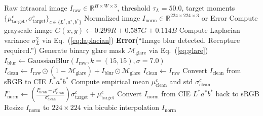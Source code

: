 \documentclass[journal]{IEEEtran}
\begin{document}
\begin{algorithm}[t]
\caption{Optical Standardization and Reinhard Color Normalization}
\label{alg:optical_normalization}
\begin{algorithmic}[1]
\REQUIRE Raw intraoral image $I_{\text{raw}} \in \mathbb{R}^{H \times W \times 3}$, threshold $\tau_L = 50.0$, target moments $\{\mu_{\text{target}}^c, \sigma_{\text{target}}^c\}_{c \in \{L^*, a^*, b^*\}}$
\ENSURE Normalized image $I_{\text{norm}} \in \mathbb{R}^{224 \times 224 \times 3}$ or Error
\STATE Compute grayscale image $G(x, y) \leftarrow 0.299R + 0.587G + 0.114B$
\STATE Compute Laplacian variance $\sigma_L^2$ via Eq.~(\ref{eq:laplacian})
    \RETURN \textbf{Error}(``Image blur detected. Recapture required.'')
\ENDIF
\STATE Generate binary glare mask $\mathcal{M}_{\text{glare}}$ via Eq.~(\ref{eq:glare})
    \STATE $I_{\text{blur}} \leftarrow \text{GaussianBlur}(I_{\text{raw}}, k=(15, 15), \sigma=7.0)$
    \STATE $I_{\text{clean}} \leftarrow I_{\text{raw}} \odot (1 - \mathcal{M}_{\text{glare}}) + I_{\text{blur}} \odot \mathcal{M}_{\text{glare}}$
\ELSE
    \STATE $I_{\text{clean}} \leftarrow I_{\text{raw}}$
\ENDIF
\STATE Convert $I_{\text{clean}}$ from sRGB to CIE $L^*a^*b^*$
    \STATE Compute empirical mean $\mu_{\text{clean}}^c$ and std $\sigma_{\text{clean}}^c$
    \STATE $I_{\text{norm}}^c \leftarrow \left(\frac{I_{\text{clean}}^c - \mu_{\text{clean}}^c}{\sigma_{\text{clean}}^c}\right) \sigma_{\text{target}}^c + \mu_{\text{target}}^c$
\ENDFOR
\STATE Convert $I_{\text{norm}}$ from CIE $L^*a^*b^*$ back to sRGB
\STATE Resize $I_{\text{norm}}$ to $224 \times 224$ via bicubic interpolation
\RETURN $I_{\text{norm}}$
\end{algorithmic}
\end{algorithm}
\end{document}
